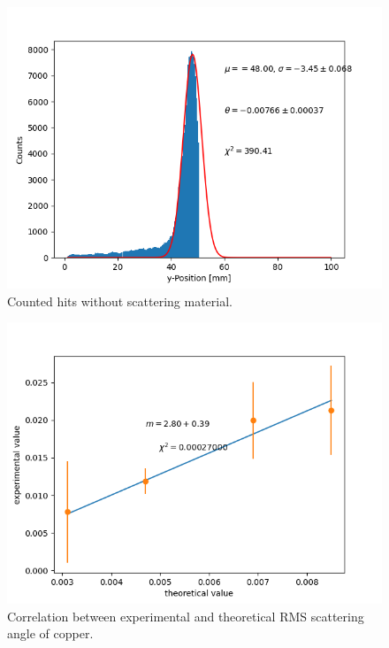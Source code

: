 \documentclass[sn-mathphys-num,iicol]{sn-jnl}
\theoremstyle{thmstyleone}
\theoremstyle{thmstyletwo}
\theoremstyle{thmstylethree}
\begin{document}
\begin{figure}
  \includegraphics[width=.9\linewidth]{../src/elsa/finished_plots/no target.png}
  \caption{Counted hits without scattering material.}
  \label{fig:hist_notarget}
\end{figure}

\begin{figure}
  \includegraphics[width=0.9\linewidth]{../src/elsa/finished_plots/Copper.png}
  \caption{Correlation between experimental and theoretical RMS scattering angle of copper.}
  \label{fig:correlation_cop}  
\end{figure}
\end{document}
